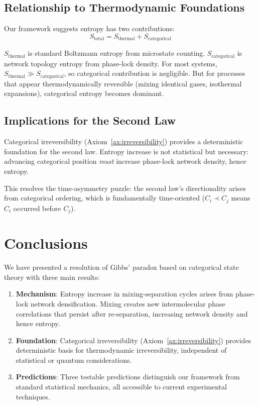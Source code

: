 \subsection{Relationship to Thermodynamic Foundations}

Our framework suggests entropy has two contributions:
\begin{equation}
S_{\text{total}} = S_{\text{thermal}} + S_{\text{categorical}}
\end{equation}

$S_{\text{thermal}}$ is standard Boltzmann entropy from microstate counting. $S_{\text{categorical}}$ is network topology entropy from phase-lock density. For most systems, $S_{\text{thermal}} \gg S_{\text{categorical}}$, so categorical contribution is negligible. But for processes that appear thermodynamically reversible (mixing identical gases, isothermal expansions), categorical entropy becomes dominant.

\subsection{Implications for the Second Law}

Categorical irreversibility (Axiom~\ref{ax:irreversibility}) provides a deterministic foundation for the second law. Entropy increase is not statistical but necessary: advancing categorical position \emph{must} increase phase-lock network density, hence entropy.

This resolves the time-asymmetry puzzle: the second law's directionality arises from categorical ordering, which is fundamentally time-oriented ($C_i \prec C_j$ means $C_i$ occurred before $C_j$).

\section{Conclusions}

We have presented a resolution of Gibbs' paradox based on categorical state theory with three main results:

\begin{enumerate}
\item \textbf{Mechanism}: Entropy increase in mixing-separation cycles arises from phase-lock network densification. Mixing creates new intermolecular phase correlations that persist after re-separation, increasing network density and hence entropy.

\item \textbf{Foundation}: Categorical irreversibility (Axiom~\ref{ax:irreversibility}) provides deterministic basis for thermodynamic irreversibility, independent of statistical or quantum considerations.

\item \textbf{Predictions}: Three testable predictions distinguish our framework from standard statistical mechanics, all accessible to current experimental techniques.
\end{enumerate}

